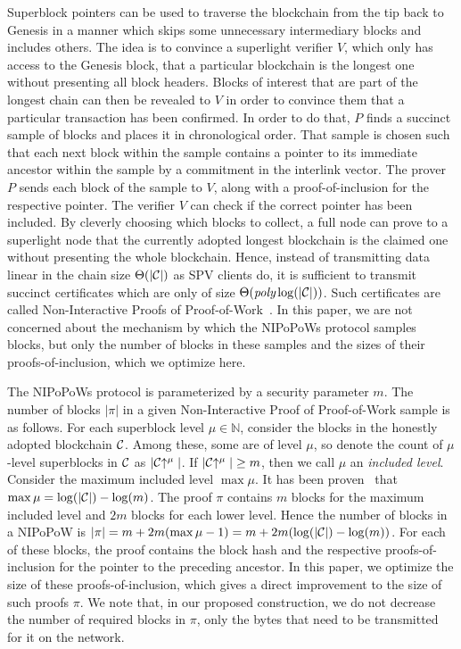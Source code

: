 Superblock pointers can be used to traverse the blockchain from the tip back to
Genesis in a manner which skips some unnecessary intermediary blocks and
includes others. The idea is to convince a superlight verifier $V$, which only
has access to the Genesis block, that a particular blockchain is the longest one
without presenting all block headers. Blocks of interest that are part of the
longest chain can then be revealed to $V$ in order to convince them that a
particular transaction has been confirmed. In order to do that, $P$ finds a
succinct sample of blocks and places it in chronological order. That sample is
chosen such that each next block within the sample contains a pointer to its
immediate ancestor within the sample by a commitment in the interlink vector.
The prover $P$ sends each block of the sample to $V$, along with a
proof-of-inclusion for the respective pointer. The verifier $V$ can check if the
correct pointer has been included. By cleverly choosing which blocks to collect,
a full node can prove to a superlight node that the currently adopted longest
blockchain is the claimed one without presenting the whole blockchain. Hence,
instead of transmitting data linear in the chain size $\Theta(|\mathcal{C}|)$ as SPV
clients do, it is sufficient to transmit succinct certificates which are only of
size $\Theta(\emph{poly}\log(|\mathcal{C}|))$. Such certificates are called
Non-Interactive Proofs of Proof-of-Work~\cite{nipopows}. In this paper, we are
not concerned about the mechanism by which the NIPoPoWs protocol samples blocks,
but only the number of blocks in these samples and the sizes of their
proofs-of-inclusion, which we optimize here.

The NIPoPoWs protocol is parameterized by a security parameter $m$. The number
of blocks $|\pi|$ in a given Non-Interactive Proof of Proof-of-Work sample is as
follows. For each superblock level $\mu \in \mathbb{N}$, consider the
blocks in the honestly adopted blockchain $\mathcal{C}$. Among these, some
are of level $\mu$, so denote the count of $\mu$-level superblocks in $\mathcal{C}$
as $|\mathcal{C}\negthickspace\uparrow^\mu|$. If $|\mathcal{C}\negthickspace\uparrow^\mu| \geq m$, then we call $\mu$
an \emph{included level}. Consider the maximum included level $\max\mu$. It has
been proven~\cite{nipopows} that $\max\mu = \log(|\mathcal{C}|) - \log(m)$. The proof
$\pi$ contains $m$ blocks for the maximum included level and $2m$ blocks for
each lower level. Hence the number of blocks in a NIPoPoW is
$|\pi| = m + 2m(\max\mu - 1) = m + 2m(\log(|\mathcal{C}|) - \log(m))$. For each of
these blocks, the proof contains the block hash and the respective
proofs-of-inclusion for the pointer to the preceding ancestor. In this paper, we
optimize the size of these proofs-of-inclusion, which gives a direct improvement
to the size of such proofs $\pi$. We note that, in our proposed construction,
we do not decrease the number of required blocks in $\pi$, only the bytes that
need to be transmitted for it on the network.


